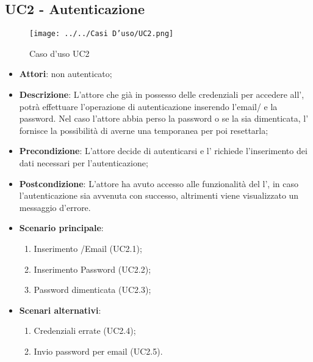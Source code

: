 \subsection{UC2 - Autenticazione}
\label{ssec:UC2}
\begin{figure}[h!]
\centering
\texttt{[image: ../../Casi D'uso/UC2.png]}
\caption{Caso d'uso UC2}
 \end{figure}
\begin{itemize}
\item \textbf{Attori}:  non autenticato;
\item \textbf{Descrizione}: L'attore che già in possesso delle credenziali per accedere all', potrà effettuare l'operazione di autenticazione inserendo l'email/ e la password. Nel caso l’attore abbia perso la password o se la sia dimenticata, l' fornisce la possibilità di averne una temporanea per poi resettarla;
\item \textbf{Precondizione}: L'attore decide di autenticarsi e l' richiede l'inserimento dei dati necessari per l'autenticazione;
\item \textbf{Postcondizione}: L'attore ha avuto accesso alle funzionalità del l', in caso l'autenticazione sia avvenuta con successo, altrimenti viene visualizzato un messaggio d'errore.
\item \textbf{Scenario principale}: \begin{enumerate}\item Inserimento /Email (UC2.1);\item Inserimento Password (UC2.2);\item Password dimenticata (UC2.3);  \end{enumerate}

\item \textbf{Scenari alternativi}: \begin{enumerate}
\item Credenziali errate (UC2.4);\item Invio password per email (UC2.5). \end{enumerate}

\end{itemize}
